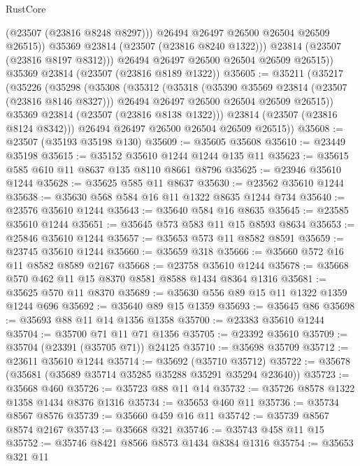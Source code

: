 \begin{lexlean}{RustCore}
\begin{coremodule}
                  (@23507 (@23816 @8248 @8297)))
                @26494
                @26497
                @26500
                @26504
                @26509
                @26515))
            @35369
            @23814
            (@23507 (@23816 @8240 @1322)))
          @23814
          (@23507 (@23816 @8197 @8312)))
        @26494
        @26497
        @26500
        @26504
        @26509
        @26515))
    @35369
    @23814
    (@23507 (@23816 @8189 @1322))
@35605 := @35211
    (@35217
      (@35226
        (@35298
          (@35308
            (@35312
              (@35318
                (@35390 @35569 @23814 (@23507 (@23816 @8146 @8327)))
                @26494
                @26497
                @26500
                @26504
                @26509
                @26515))
            @35369
            @23814
            (@23507 (@23816 @8138 @1322)))
          @23814
          (@23507 (@23816 @8124 @8342)))
        @26494
        @26497
        @26500
        @26504
        @26509
        @26515))
@35608 := @23507 (@35193 @35198 @130)
@35609 := @35605 @35608
@35610 := @23449 @35198
@35615 := @35152 @35610 @1244 @1244 @135 @11
@35623 := @35615 @585 @610 @11 @8637 @135 @8110 @8661 @8796
@35625 := @23946 @35610 @1244
@35628 := @35625 @585 @11 @8637
@35630 := @23562 @35610 @1244
@35638 := @35630 @568 @584 @16 @11 @1322 @8635 @1244 @734
@35640 := @23576 @35610 @1244
@35643 := @35640 @584 @16 @8635
@35645 := @23585 @35610 @1244
@35651 := @35645 @573 @583 @11 @15 @8593 @8634
@35653 := @25846 @35610 @1244
@35657 := @35653 @573 @11 @8582 @8591
@35659 := @23745 @35610 @1244
@35660 := @35659 @318
@35666 := @35660 @572 @16 @11 @8582 @8589 @2167
@35668 := @23758 @35610 @1244
@35678 := @35668 @570 @462 @11 @15 @8370 @8581 @8588 @1434 @8364 @1316
@35681 := @35625 @570 @11 @8370
@35689 := @35630 @556 @89 @15 @11 @1322 @1359 @1244 @696
@35692 := @35640 @89 @15 @1359
@35693 := @35645 @86
@35698 := @35693 @88 @11 @14 @1356 @1358
@35700 := @23383 @35610 @1244
@35704 := @35700 @71 @11 @71 @1356
@35705 := @23392 @35610
@35709 := @35704 (@23391 (@35705 @71)) @24125
@35710 := @35698 @35709
@35712 := @23611 @35610 @1244
@35714 := @35692 (@35710 @35712)
@35722 := @35678 (@35681 (@35689 @35714 @35285 @35288 @35291 @35294 @23640))
@35723 := @35668 @460
@35726 := @35723 @88 @11 @14
@35732 := @35726 @8578 @1322 @1358 @1434 @8376 @1316
@35734 := @35653 @460 @11
@35736 := @35734 @8567 @8576
@35739 := @35660 @459 @16 @11
@35742 := @35739 @8567 @8574 @2167
@35743 := @35668 @321
@35746 := @35743 @458 @11 @15
@35752 := @35746 @8421 @8566 @8573 @1434 @8384 @1316
@35754 := @35653 @321 @11

\end{coremodule}
\end{lexlean}
